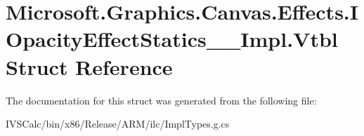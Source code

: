 \hypertarget{struct_microsoft_1_1_graphics_1_1_canvas_1_1_effects_1_1_i_opacity_effect_statics_____impl_1_1_vtbl}{}\section{Microsoft.\+Graphics.\+Canvas.\+Effects.\+I\+Opacity\+Effect\+Statics\+\_\+\+\_\+\+Impl.\+Vtbl Struct Reference}
\label{struct_microsoft_1_1_graphics_1_1_canvas_1_1_effects_1_1_i_opacity_effect_statics_____impl_1_1_vtbl}


The documentation for this struct was generated from the following file\+:\begin{DoxyCompactItemize}
\item 
I\+V\+S\+Calc/bin/x86/\+Release/\+A\+R\+M/ilc/Impl\+Types.\+g.\+cs\end{DoxyCompactItemize}
